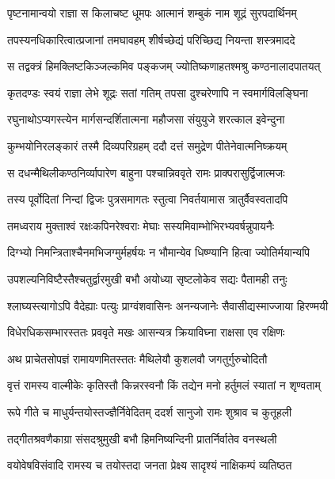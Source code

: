 \twolineshloka
{पृष्टनामान्वयो राज्ञा स किलाचष्ट धूमपः}
{आत्मानं शम्बुकं नाम शूद्रं सुरपदार्थिनम्} %

\twolineshloka
{तपस्यनधिकारित्वात्प्रजानां तमघावहम्}
{शीर्षच्छेद्यं परिच्छिद्य नियन्ता शस्त्रमाददे} %

\twolineshloka
{स तद्वक्त्रं हिमक्लिष्टकिञ्जल्कमिव पङ्कजम्}
{ज्योतिष्कणाहतश्मश्रु कण्ठनालादपातयत्} %

\twolineshloka
{कृतदण्डः स्वयं राज्ञा लेभे शूद्रः सतां गतिम्}
{तपसा दुश्चरेणापि न स्वमार्गविलङ्घिना} %

\twolineshloka
{रघुनाथोऽप्यगस्त्येन मार्गसन्दर्शितात्मना}
{महौजसा संयुयुजे शरत्काल इवेन्दुना} %

\twolineshloka
{कुम्भयोनिरलङ्कारं तस्मै दिव्यपरिग्रहम्}
{ददौ दत्तं समुद्रेण पीतेनेवात्मनिष्क्रयम्} %

\twolineshloka
{स दधन्मैथिलीकण्ठनिर्व्यापारेण बाहुना}
{पश्चान्निववृते रामः प्राक्परासुर्द्विजात्मजः} %

\twolineshloka
{तस्य पूर्वोदितां निन्दां द्विजः पुत्रसमागतः}
{स्तुत्वा निवर्तयामास त्रातुर्वैवस्वतादपि} %

\twolineshloka
{तमध्वराय मुक्ताश्वं रक्षःकपिनरेश्वराः}
{मेघाः सस्यमिवाम्भोभिरभ्यवर्षन्नुपायनैः} %

\twolineshloka
{दिग्भ्यो निमन्त्रिताश्चैनमभिजग्मुर्महर्षयः}
{न भौमान्येव धिष्ण्यानि हित्वा ज्योतिर्मयान्यपि} %

\twolineshloka
{उपशल्यनिविष्टैस्तैश्चतुर्द्वारमुखी बभौ}
{अयोध्या सृष्टलोकेव सद्यः पैतामही तनुः} %

\twolineshloka
{श्लाघ्यस्त्यागोऽपि वैदेह्याः पत्युः प्राग्वंशवासिनः}
{अनन्यजानेः सैवासीद्यस्माज्जाया हिरण्मयी} %

\twolineshloka
{विधेरधिकसम्भारस्ततः प्रववृते मखः}
{आसन्यत्र क्रियाविघ्ना राक्षसा एव रक्षिणः} %

\twolineshloka
{अथ प्राचेतसोपज्ञं रामायणमितस्ततः}
{मैथिलेयौ कुशलवौ जगतुर्गुरुचोदितौ} %

\twolineshloka
{वृत्तं रामस्य वाल्मीकेः कृतिस्तौ किन्नरस्वनौ}
{किं तद्येन मनो हर्तुमलं स्यातां न शृण्वताम्} %

\twolineshloka
{रूपे गीते च माधुर्यन्तयोस्तज्ज्ञैर्निवेदितम्}
{ददर्श सानुजो रामः शुश्राव च कुतूहली} %

\twolineshloka
{तद्गीतश्रवणैकाग्रा संसदश्रुमुखी बभौ}
{हिमनिष्यन्दिनी प्रातर्निर्वातेव वनस्थली} %

\twolineshloka
{वयोवेषविसंवादि रामस्य च तयोस्तदा}
{जनता प्रेक्ष्य सादृश्यं नाक्षिकम्पं व्यतिष्ठत} %

